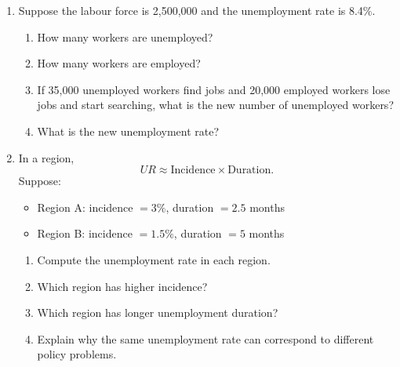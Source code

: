 \documentclass[12pt]{article}
\begin{document}
\begin{enumerate}
\begin{enumerate}[label=(\alph*)]
    \item Compute the labour force.
    \item Compute the unemployment rate.
    \item Compute the labour force participation rate.
    \item Compute the employment rate.
\end{enumerate}

\item Suppose the labour force is 2{,}500{,}000 and the unemployment rate is 8.4\%.

\begin{enumerate}[label=(\alph*)]
    \item How many workers are unemployed?
    \item How many workers are employed?
    \item If 35{,}000 unemployed workers find jobs and 20{,}000 employed workers lose jobs and start searching, what is the new number of unemployed workers?
    \item What is the new unemployment rate?
\end{enumerate}

\item In a region,
\[
UR \approx \text{Incidence} \times \text{Duration}.
\]
Suppose:
\begin{itemize}
    \item Region A: incidence \(= 3\%\), duration \(= 2.5\) months
    \item Region B: incidence \(= 1.5\%\), duration \(= 5\) months
\end{itemize}

\begin{enumerate}[label=(\alph*)]
    \item Compute the unemployment rate in each region.
    \item Which region has higher incidence?
    \item Which region has longer unemployment duration?
    \item Explain why the same unemployment rate can correspond to different policy problems.
\end{enumerate}


\end{enumerate}
\end{document}
